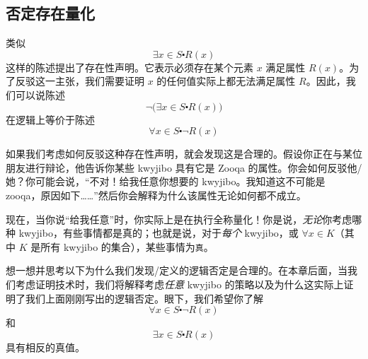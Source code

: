 \subsection{否定存在量化}

类似 
\[\exists x \in S \centerdot R(x)\] 
这样的陈述提出了存在性声明。它表示必须存在某个元素 $x$ 满足属性 $R(x)$。为了反驳这一主张，我们需要证明 $x$ 的任何值实际上都无法满足属性 $R$。因此，我们可以说陈述
\[\neg\big(\exists x \in S \centerdot R(x)\big)\]
在逻辑上等价于陈述 
\[\forall x \in S \centerdot \neg R(x)\]

如果我们考虑如何反驳这种存在性声明，就会发现这是合理的。假设你正在与某位朋友进行辩论，他告诉你某些 kwyjibo 具有它是 Zooqa 的属性。你会如何反驳他/她？你可能会说，``不对！给我任意你想要的 kwyjibo。我知道这不可能是 zooqa，原因如下……''然后你会解释为什么该属性无论如何都不成立。

现在，当你说``给我任意''时，你实际上是在执行全称量化！你是说，\emph{无论}你考虑哪种 kwyjibo，有些事情都是真的；也就是说，对于\emph{每个} kwyjibo，或 $\forall x \in K$（其中 $K$ 是所有 kwyjibo 的集合），某些事情为\verb|真|。

想一想并思考以下为什么我们发现/定义的逻辑否定是合理的。在本章后面，当我们考虑证明技术时，我们将解释考虑\emph{任意} kwyjibo 的策略以及为什么这实际上证明了我们上面刚刚写出的逻辑否定。眼下，我们希望你了解
\[\forall x \in S \centerdot \neg R(x)\] 
和
\[\exists x \in S \centerdot R(x)\]
具有相反的真值。
